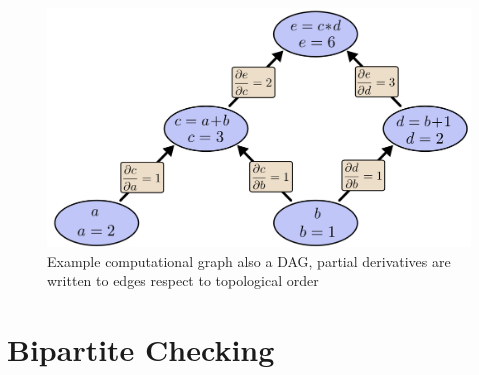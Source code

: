 \documentclass[12pt]{article}
\begin{document}
\begin{figure}[h!]
\begin{center}
\includegraphics[scale = .25]{tree-def.png}    
 \end{center}
\caption{Example computational graph also a DAG, partial derivatives are written to edges respect to topological order}

  \label{fig}
\end{figure}



\section{Bipartite Checking}
\end{document}
